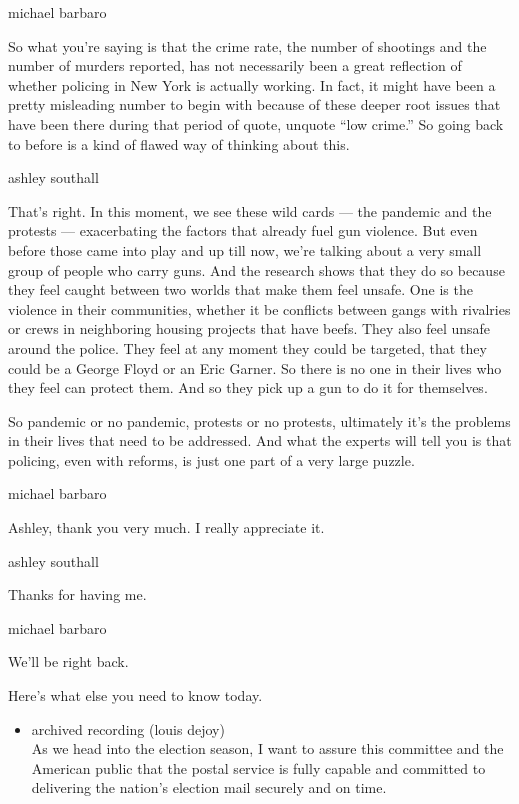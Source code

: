 michael barbaro

So what you're saying is that the crime rate, the number of shootings
and the number of murders reported, has not necessarily been a great
reflection of whether policing in New York is actually working. In fact,
it might have been a pretty misleading number to begin with because of
these deeper root issues that have been there during that period of
quote, unquote ``low crime.'' So going back to before is a kind of
flawed way of thinking about this.

ashley southall

That's right. In this moment, we see these wild cards --- the pandemic
and the protests --- exacerbating the factors that already fuel gun
violence. But even before those came into play and up till now, we're
talking about a very small group of people who carry guns. And the
research shows that they do so because they feel caught between two
worlds that make them feel unsafe. One is the violence in their
communities, whether it be conflicts between gangs with rivalries or
crews in neighboring housing projects that have beefs. They also feel
unsafe around the police. They feel at any moment they could be
targeted, that they could be a George Floyd or an Eric Garner. So there
is no one in their lives who they feel can protect them. And so they
pick up a gun to do it for themselves.

So pandemic or no pandemic, protests or no protests, ultimately it's the
problems in their lives that need to be addressed. And what the experts
will tell you is that policing, even with reforms, is just one part of a
very large puzzle.

michael barbaro

Ashley, thank you very much. I really appreciate it.

ashley southall

Thanks for having me.

michael barbaro

We'll be right back.

Here's what else you need to know today.

\begin{itemize}
\tightlist
\item
  archived recording (louis dejoy)\\
  As we head into the election season, I want to assure this committee
  and the American public that the postal service is fully capable and
  committed to delivering the nation's election mail securely and on
  time.
\end{itemize}

